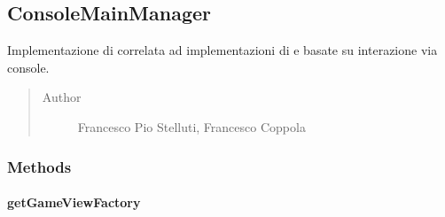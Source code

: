 \documentclass[letterpaper,10pt,italian,openany,oneside]{sphinxmanual}
\begin{document}
\begin{fulllineitems}
\label{\detokenize{source/it/unicam/cs/pa/mastermind/gamecore/ColorPegs:it.unicam.cs.pa.mastermind.gamecore.ColorPegs.YELLOW}}
\end{fulllineitems}



\subsection{ConsoleMainManager}
\label{\detokenize{source/it/unicam/cs/pa/mastermind/gamecore/ConsoleMainManager:consolemainmanager}}\label{\detokenize{source/it/unicam/cs/pa/mastermind/gamecore/ConsoleMainManager::doc}}

\begin{fulllineitems}
\label{\detokenize{source/it/unicam/cs/pa/mastermind/gamecore/ConsoleMainManager:it.unicam.cs.pa.mastermind.gamecore.ConsoleMainManager}}
Implementazione di  correlata ad implementazioni di  e  basate su interazione via console.
\begin{quote}\begin{description}
\item[{Author}] \leavevmode
Francesco Pio Stelluti, Francesco Coppola

\end{description}\end{quote}

\end{fulllineitems}



\subsubsection{Methods}
\label{\detokenize{source/it/unicam/cs/pa/mastermind/gamecore/ConsoleMainManager:methods}}

\paragraph{getGameViewFactory}
\label{\detokenize{source/it/unicam/cs/pa/mastermind/gamecore/ConsoleMainManager:getgameviewfactory}}
\end{document}
